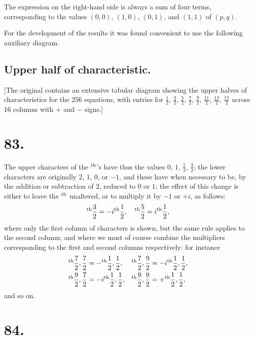 \documentclass[11pt,a4paper]{book}
\providecommand{\uth}{\textsuperscript{th}}
\begin{document}
The expression on the right-hand side is always a sum of four terms, corresponding to the values $(0,0)$, $(1,0)$, $(0,1)$, and $(1,1)$ of $(p,q)$.

For the development of the results it was found convenient to use the following auxiliary diagram.

\subsection*{Upper half of characteristic.}

[The original contains an extensive tabular diagram showing the upper halves of characteristics for the 256 equations, with entries for $\frac{1}{2}$, $\frac{3}{2}$, $\frac{5}{2}$, $\frac{7}{2}$, $\frac{9}{2}$, $\frac{11}{2}$, $\frac{13}{2}$, $\frac{15}{2}$ across 16 columns with $+$ and $-$ signs.]

\newpage
\section*{83.}
\label{sec:83}

The upper characters of the $\uth{}$'s have thus the values $0$, $1$, $\frac{1}{2}$, $\frac{3}{2}$; the lower characters are originally $2$, $1$, $0$, or $-1$, and these have when necessary to be, by the addition or subtraction of $2$, reduced to $0$ or $1$; the effect of this change is either to leave the $\uth{}$ unaltered, or to multiply it by $-1$ or $+i$, as follows:
\[
\uth{\frac{3}{2}} = -i\uth{\frac{1}{2}}, \quad \uth{\frac{5}{2}} = i\uth{\frac{1}{2}},
\]
where only the first column of characters is shown, but the same rule applies to the second column; and where we must of course combine the multipliers corresponding to the first and second columns respectively: for instance
\begin{align*}
\uth{\frac{7}{2}, \frac{7}{2}} &= -\uth{\frac{1}{2}, \frac{1}{2}}, &
\uth{\frac{7}{2}, \frac{9}{2}} &= -i\uth{\frac{1}{2}, \frac{1}{2}}, \\
\uth{\frac{9}{2}, \frac{7}{2}} &= -i\uth{\frac{1}{2}, \frac{1}{2}}, &
\uth{\frac{9}{2}, \frac{9}{2}} &= +\uth{\frac{1}{2}, \frac{1}{2}},
\end{align*}
and so on.

\newpage
\section*{84.}
\label{sec:84}
\end{document}
